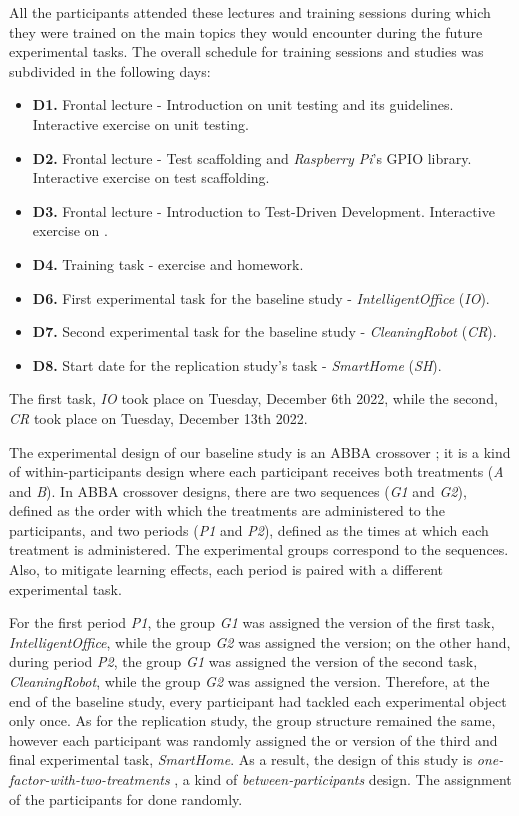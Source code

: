 All the participants attended these lectures and training sessions during which they were trained on the main topics they would encounter during the future experimental tasks. The overall schedule for training sessions and studies was subdivided in the following days:
\begin{itemize}
    \item \textbf{D1.} Frontal lecture - Introduction on unit testing and its guidelines. Interactive exercise on unit testing.
    \item \textbf{D2.} Frontal lecture - Test scaffolding and \textit{Raspberry Pi}'s GPIO library. Interactive exercise on test scaffolding.
    \item \textbf{D3.} Frontal lecture - Introduction to Test-Driven Development. Interactive exercise on \tdd.
    \item \textbf{D4.} Training task - \tdd exercise and homework.
    \item \textbf{D6.} First experimental task for the baseline study - \textit{IntelligentOffice} (\textit{IO}).
    \item \textbf{D7.} Second experimental task for the baseline study - \textit{CleaningRobot} (\textit{CR}).
    \item \textbf{D8.} Start date for the replication study's task - \textit{SmartHome} (\textit{SH}).
\end{itemize}


The first task, \textit{IO} took place on Tuesday, December 6th 2022, while the second, \textit{CR} took place on Tuesday, December 13th 2022. 


The experimental design of our baseline study is an ABBA crossover \cite{DBLP:journals/tse/VegasAJ16}; it is a kind of within-participants design where each participant receives both treatments (\ie \textit{A} and \textit{B}). In ABBA crossover designs, there are two sequences (\ie \textit{G1} and \textit{G2}), defined as the order with which the treatments are administered to the participants, and two periods (\ie \textit{P1} and \textit{P2}), defined as the times at which each treatment is administered. The experimental groups correspond to the sequences. Also, to mitigate learning effects, each period is paired with a
different experimental task.

For the first period \textit{P1}, the group \textit{G1} was assigned the \tdd version of the first task, \textit{IntelligentOffice}, while the group \textit{G2} was assigned the \notdd version; on the other hand, during period \textit{P2}, the group \textit{G1} was assigned the \notdd version of the second task, \textit{CleaningRobot}, while the group \textit{G2} was assigned the \tdd version.
Therefore, at the end of the baseline study, every participant had tackled each experimental object only once.
As for the replication study, the group structure remained the same, however each participant was randomly assigned the \tdd or \notdd version of the third and final experimental task, \textit{SmartHome}. As a result, the design of this study is \textit{one-factor-with-two-treatments} \cite{DBLP:books/sp/WohlinRHOR00}, a kind of \textit{between-participants} design. The assignment of the participants for done randomly.

